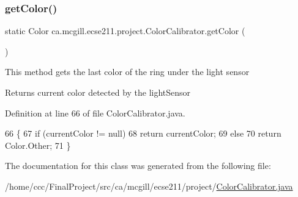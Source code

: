 \subsubsection{\texorpdfstring{get\+Color()}{getColor()}\hspace{0.1cm}{\footnotesize\ttfamily [2/2]}}
{\footnotesize\ttfamily static Color ca.\+mcgill.\+ecse211.\+project.\+Color\+Calibrator.\+get\+Color (\begin{DoxyParamCaption}{ }\end{DoxyParamCaption})\hspace{0.3cm}{\ttfamily [static]}}

This method gets the last color of the ring under the light sensor

\begin{DoxyReturn}{Returns}
current color detected by the light\+Sensor 
\end{DoxyReturn}


Definition at line 66 of file Color\+Calibrator.\+java.


\begin{DoxyCode}
66                                  \{
67     \textcolor{keywordflow}{if} (currentColor != null)
68       \textcolor{keywordflow}{return} currentColor;
69     \textcolor{keywordflow}{else}
70       \textcolor{keywordflow}{return} Color.Other;
71   \}
\end{DoxyCode}


The documentation for this class was generated from the following file\+:\begin{DoxyCompactItemize}
\item 
/home/ccc/\+Final\+Project/src/ca/mcgill/ecse211/project/\hyperlink{_color_calibrator_8java}{Color\+Calibrator.\+java}\end{DoxyCompactItemize}

